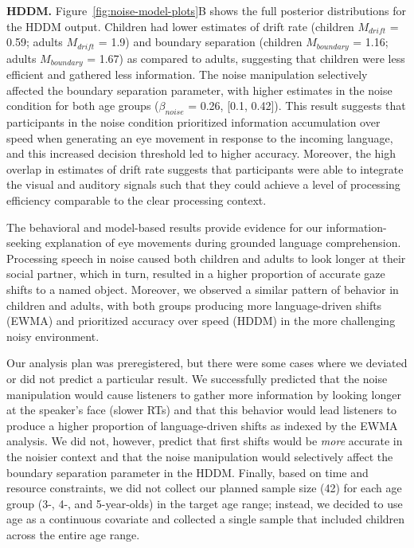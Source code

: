 \documentclass[oneside]{report}
\begin{document}
\textbf{HDDM.} Figure~\ref{fig:noise-model-plots}B shows the full
posterior distributions for the HDDM output. Children had lower
estimates of drift rate (children \(M_{drift}\) = 0.59; adults
\(M_{drift}\) = 1.9) and boundary separation (children \(M_{boundary}\)
= 1.16; adults \(M_{boundary}\) = 1.67) as compared to adults,
suggesting that children were less efficient and gathered less
information. The noise manipulation selectively affected the boundary
separation parameter, with higher estimates in the noise condition for
both age groups (\(\beta_{noise}\) = 0.26, {[}0.1, 0.42{]}). This result
suggests that participants in the noise condition prioritized
information accumulation over speed when generating an eye movement in
response to the incoming language, and this increased decision threshold
led to higher accuracy. Moreover, the high overlap in estimates of drift
rate suggests that participants were able to integrate the visual and
auditory signals such that they could achieve a level of processing
efficiency comparable to the clear processing context.

The behavioral and model-based results provide evidence for our
information-seeking explanation of eye movements during grounded
language comprehension. Processing speech in noise caused both children
and adults to look longer at their social partner, which in turn,
resulted in a higher proportion of accurate gaze shifts to a named
object. Moreover, we observed a similar pattern of behavior in children
and adults, with both groups producing more language-driven shifts
(EWMA) and prioritized accuracy over speed (HDDM) in the more
challenging noisy environment.

Our analysis plan was preregistered, but there were some cases where we
deviated or did not predict a particular result. We successfully
predicted that the noise manipulation would cause listeners to gather
more information by looking longer at the speaker's face (slower RTs)
and that this behavior would lead listeners to produce a higher
proportion of language-driven shifts as indexed by the EWMA analysis. We
did not, however, predict that first shifts would be \emph{more}
accurate in the noisier context and that the noise manipulation would
selectively affect the boundary separation parameter in the HDDM.
Finally, based on time and resource constraints, we did not collect our
planned sample size (42) for each age group (3-, 4-, and 5-year-olds) in
the target age range; instead, we decided to use age as a continuous
covariate and collected a single sample that included children across
the entire age range.
\end{document}

